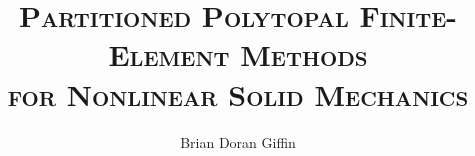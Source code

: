 \documentclass[12pt]{ucdavisthesis}
\title          {\textsc{Partitioned Polytopal Finite-Element Methods\\
                 for Nonlinear Solid Mechanics}}
\author         {Brian Doran Giffin}
\begin{document}
\newcommand{\bibfont}{\singlespacing}



\makeintropages %


%

%





\appendix





%	
%	
\end{document}
